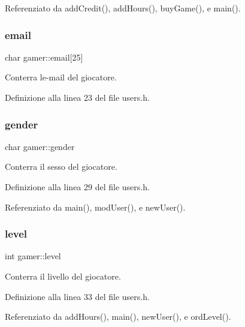 Referenziato da add\+Credit(), add\+Hours(), buy\+Game(), e main().

\mbox{\label{structgamer_ae73e44d41ea32b5354bd60db7928ef11}} 
\subsubsection{\texorpdfstring{email}{email}}
{\footnotesize\ttfamily char gamer\+::email\mbox{[}25\mbox{]}}



Conterra\textquotesingle{} l\textquotesingle{}e-\/mail del giocatore. 



Definizione alla linea 23 del file users.\+h.

\mbox{\label{structgamer_a4c445cd1faa7464bfb01a1745a23c85a}} 
\subsubsection{\texorpdfstring{gender}{gender}}
{\footnotesize\ttfamily char gamer\+::gender}



Conterra\textquotesingle{} il sesso del giocatore. 



Definizione alla linea 29 del file users.\+h.



Referenziato da main(), mod\+User(), e new\+User().

\mbox{\label{structgamer_a611b73d05bac2a5a2ee6b4de489e18bb}} 
\subsubsection{\texorpdfstring{level}{level}}
{\footnotesize\ttfamily int gamer\+::level}



Conterra\textquotesingle{} il livello del giocatore. 



Definizione alla linea 33 del file users.\+h.



Referenziato da add\+Hours(), main(), new\+User(), e ord\+Level().

